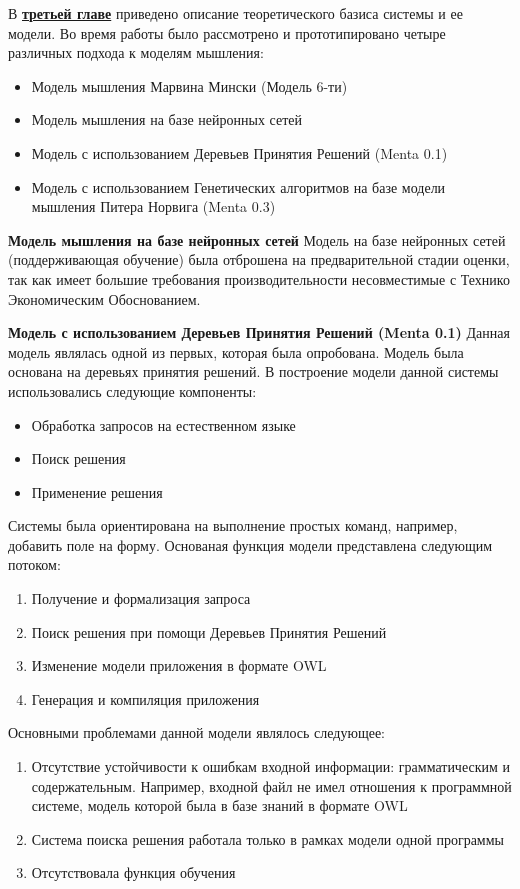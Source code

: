\clearpage
В \underline{\textbf{третьей главе}} приведено описание теоретического базиса системы и ее модели. Во время работы было рассмотрено и прототипировано четыре различных подхода к моделям мышления:
\begin{itemize}
	\item Модель мышления Марвина Мински (Модель 6-ти)
	\item Модель мышления на базе нейронных сетей 
	\item Модель с использованием Деревьев Принятия Решений (Menta 0.1)
	\item Модель с использованием Генетических алгоритмов на базе модели мышления Питера Норвига  (Menta 0.3)
\end{itemize}



\textbf{Модель мышления на базе нейронных сетей}
Модель на базе нейронных сетей (поддерживающая обучение) была отброшена на предварительной стадии оценки, так как имеет большие требования производительности несовместимые с Технико Экономическим Обоснованием.

\textbf{Модель с использованием Деревьев Принятия Решений (Menta 0.1)}
Данная модель являлась одной из первых, которая была опробована. Модель была основана на деревьях принятия решений. В построение модели данной системы использовались следующие компоненты:
\begin{itemize}
	\item Обработка запросов на естественном языке
	\item Поиск решения
	\item Применение решения
\end{itemize}
Системы была ориентирована на выполнение простых команд, например, добавить поле на форму. Основаная функция модели представлена следующим потоком:
\begin{enumerate}
	\item Получение и формализация запроса
	\item Поиск решения при помощи Деревьев Принятия Решений
	\item Изменение модели приложения в формате OWL
	\item Генерация и компиляция приложения
\end{enumerate}
Основными проблемами данной модели являлось следующее:
\begin{enumerate}
	\item Отсутствие устойчивости к ошибкам входной информации: грамматическим и содержательным. Например, входной файл не имел отношения к программной системе, модель которой была в базе знаний в формате OWL
	\item Система поиска решения работала только в рамках модели одной программы
	\item Отсутствовала функция обучения 
\end{enumerate}



